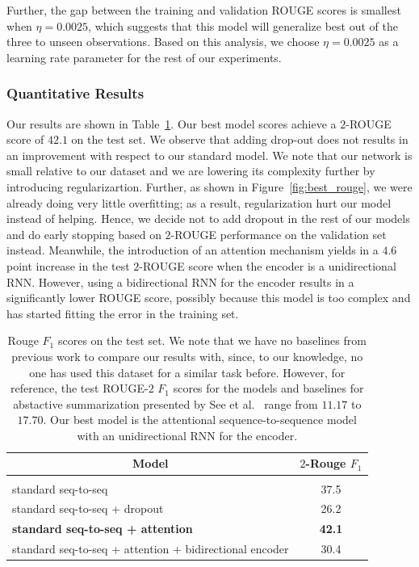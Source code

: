 \documentclass{article} %
\begin{document}
Further, the gap between the training and validation ROUGE scores is smallest when $\eta = 0.0025$, which suggests that this model will generalize best out of the three to unseen observations. 
Based on this analysis, we choose $\eta = 0.0025$ as a learning rate parameter for the rest of our experiments.     

\subsubsection{Quantitative Results}

Our results are shown in Table~\ref{tab:rouge}. 
Our best model scores achieve a $2$-ROUGE score of $42.1$ on the test set. 
We observe that adding drop-out does not results in an improvement with respect to our standard model.
We note that our network is small relative to our dataset and we are lowering its complexity further by introducing regularizartion.
Further, as shown in Figure~\ref{fig:best_rouge}, we were already doing very little overfitting; as a result, regularization hurt our model instead of helping.
Hence, we decide not to add dropout in the rest of our models and do early stopping based on $2$-ROUGE performance on the validation set instead.
Meanwhile, the introduction of an attention mechanism yields in a $4.6$ point increase in the test $2$-ROUGE score when the encoder is a unidirectional RNN. However, using a bidirectional RNN for the encoder results in a significantly lower ROUGE score, possibly because this model is too complex and has started fitting the error in the training set.   

\begin{table}[ht]
\begin{center}
\begin{tabular}{lc}
\multicolumn{1}{c}{\bf Model}  &\multicolumn{1}{c}{\bf $2$-Rouge $F_1$}\\ 
\hline \\
standard seq-to-seq & 37.5\\ 
standard seq-to-seq + dropout &  26.2\\ 
{\bf standard seq-to-seq + attention} & {\bf 42.1}\\
standard seq-to-seq + attention + bidirectional encoder & 30.4\\
\end{tabular}
\end{center}
\caption{Rouge $F_1$ scores on the test set. We note that we have no baselines from previous work to compare our results with, since, to our knowledge, no one has used this dataset for a similar task before.
However, for reference, the test ROUGE-$2$ $F_1$ scores for the models and baselines for abstactive summarization presented by See et al.~\cite{see2017get} range from $11.17$ to $17.70$. Our best model is the attentional sequence-to-sequence model with an unidirectional RNN for the encoder.}
\label{tab:rouge}
\end{table}
\end{document}
